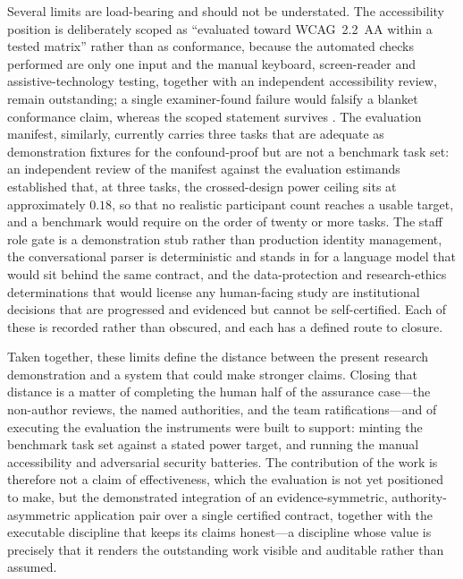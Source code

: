 Several limits are load-bearing and should not be understated. The accessibility position is
deliberately scoped as ``evaluated toward WCAG~2.2~AA within a tested matrix'' rather than as
conformance, because the automated checks performed are only one input and the manual keyboard,
screen-reader and assistive-technology testing, together with an independent accessibility review,
remain outstanding; a single examiner-found failure would falsify a blanket conformance claim, whereas
the scoped statement survives \cite{power2012guidelines, w3c2023wcag22}. The evaluation manifest,
similarly, currently carries three tasks that are adequate as demonstration fixtures for the
confound-proof but are not a benchmark task set: an independent review of the manifest against the
evaluation estimands established that, at three tasks, the crossed-design power ceiling sits at
approximately $0.18$, so that no realistic participant count reaches a usable target, and a benchmark
would require on the order of twenty or more tasks. The staff role gate is a demonstration stub rather
than production identity management, the conversational parser is deterministic and stands in for a
language model that would sit behind the same contract, and the data-protection and research-ethics
determinations that would license any human-facing study are institutional decisions that are
progressed and evidenced but cannot be self-certified. Each of these is recorded rather than obscured,
and each has a defined route to closure.

Taken together, these limits define the distance between the present research demonstration and a
system that could make stronger claims. Closing that distance is a matter of completing the human half
of the assurance case---the non-author reviews, the named authorities, and the team ratifications---and
of executing the evaluation the instruments were built to support: minting the benchmark task set
against a stated power target, and running the manual accessibility and adversarial security batteries.
The contribution of the work is therefore not a claim of effectiveness, which the evaluation is not yet
positioned to make, but the demonstrated integration of an evidence-symmetric, authority-asymmetric
application pair over a single certified contract, together with the executable discipline that keeps
its claims honest---a discipline whose value is precisely that it renders the outstanding work visible
and auditable rather than assumed.
